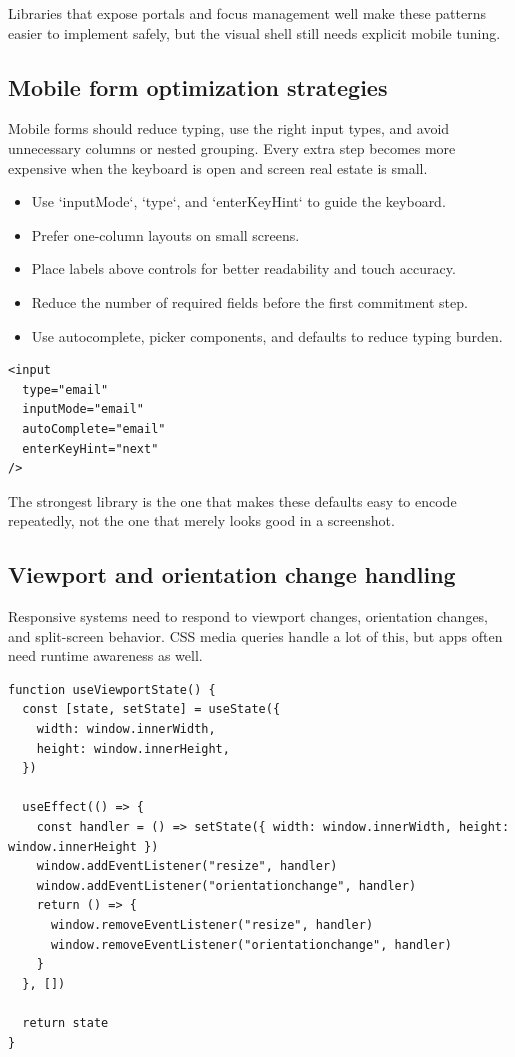 Libraries that expose portals and focus management well make these patterns easier to implement safely, but the visual shell still needs explicit mobile tuning.

\subsection{Mobile form optimization strategies}
Mobile forms should reduce typing, use the right input types, and avoid unnecessary columns or nested grouping. Every extra step becomes more expensive when the keyboard is open and screen real estate is small.

\begin{itemize}[leftmargin=*, itemsep=0.35em]
  \item Use `inputMode`, `type`, and `enterKeyHint` to guide the keyboard.
  \item Prefer one-column layouts on small screens.
  \item Place labels above controls for better readability and touch accuracy.
  \item Reduce the number of required fields before the first commitment step.
  \item Use autocomplete, picker components, and defaults to reduce typing burden.
\end{itemize}

\begin{verbatim}
<input
  type="email"
  inputMode="email"
  autoComplete="email"
  enterKeyHint="next"
/>
\end{verbatim}

The strongest library is the one that makes these defaults easy to encode repeatedly, not the one that merely looks good in a screenshot.

\subsection{Viewport and orientation change handling}
Responsive systems need to respond to viewport changes, orientation changes, and split-screen behavior. CSS media queries handle a lot of this, but apps often need runtime awareness as well.

\begin{verbatim}
function useViewportState() {
  const [state, setState] = useState({
    width: window.innerWidth,
    height: window.innerHeight,
  })

  useEffect(() => {
    const handler = () => setState({ width: window.innerWidth, height: window.innerHeight })
    window.addEventListener("resize", handler)
    window.addEventListener("orientationchange", handler)
    return () => {
      window.removeEventListener("resize", handler)
      window.removeEventListener("orientationchange", handler)
    }
  }, [])

  return state
}
\end{verbatim}

